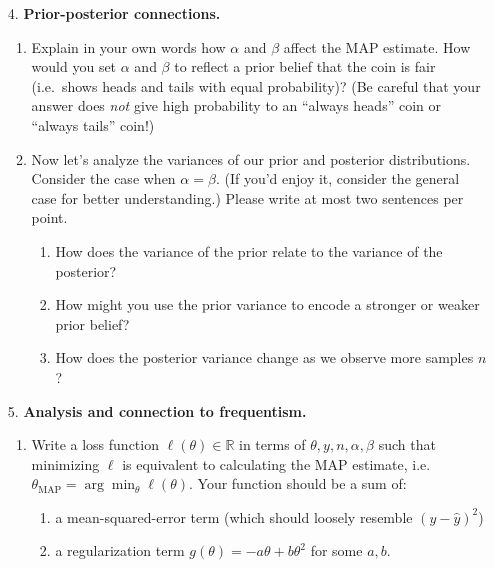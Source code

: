 \documentclass[submit]{../harvardml}
\begin{document}
\begin{framed}
\begin{enumerate}
    \item[4.]
      \textbf{Prior-posterior connections.}

      \begin{enumerate}
        \item
              Explain in your own words how \(\alpha\) and \(\beta\) affect the
              MAP estimate. How would you set \(\alpha\) and \(\beta\) to reflect
              a prior belief that the coin is fair (i.e.~shows heads and tails
              with equal probability)? (Be careful that your answer does \emph{not} give high probability to an ``always heads'' coin or ``always tails'' coin!)

        \item Now let's analyze the variances of our prior and posterior distributions. Consider the case when $\alpha = \beta$. (If you'd enjoy it, consider the general case for better understanding.) Please write at most two sentences per point.
              \begin{enumerate}
                \item How does the variance of the prior relate to the variance of the posterior?
                \item How might you use the prior variance to encode a stronger or weaker prior belief?
                \item How does the posterior variance change as we observe more samples $n$?
              \end{enumerate}
      \end{enumerate}

    \item[5.]
      \textbf{Analysis and connection to frequentism.}

      \begin{enumerate}
        \item
              Write a loss function \(\ell(\theta) \in \mathbb{R}\) in terms of
              \(\theta, y, n, \alpha, \beta\) such that minimizing \(\ell\) is
              equivalent to calculating the MAP estimate,
              i.e.~\(\theta_{\text{MAP}} = \arg \min_{\theta} \ell(\theta)\). Your
              function should be a sum of:
              \begin{enumerate}
                \item a mean-squared-error term (which should loosely resemble $(y - \hat y)^2$)
                \item a
                      regularization term \(g(\theta) = - a \theta + b \theta^{2}\) for some $a, b$.
              \end{enumerate}


\end{enumerate}
\end{enumerate}
\end{framed}
\end{document}
